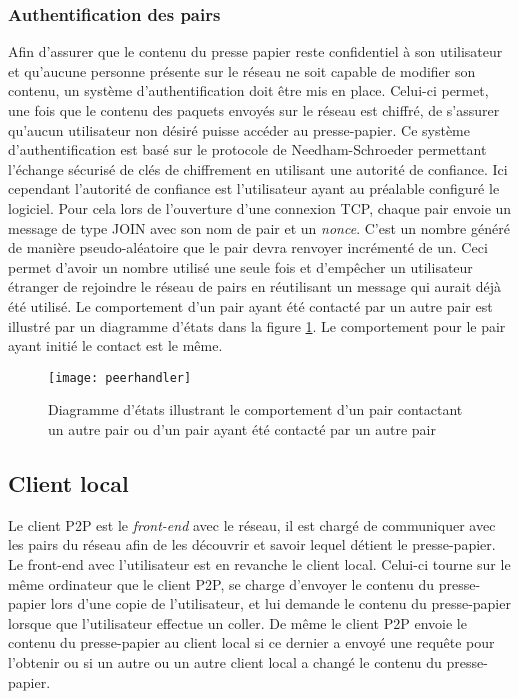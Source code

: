 \subsubsection{Authentification des pairs}
Afin d'assurer que le contenu du presse papier reste confidentiel à son
utilisateur et qu'aucune personne présente sur le réseau ne soit capable de
modifier son contenu, un système d'authentification doit être mis en place.
Celui-ci permet, une fois que le contenu des paquets envoyés sur le réseau est
chiffré, de s'assurer qu'aucun utilisateur non désiré puisse accéder au
presse-papier.
Ce système d'authentification est basé sur le protocole de Needham-Schroeder
\cite{1978Needham} permettant l'échange sécurisé de clés de chiffrement
en utilisant une autorité de confiance. Ici cependant l'autorité de confiance
est l'utilisateur ayant au préalable configuré le logiciel.
Pour cela lors de l'ouverture d'une connexion TCP, chaque
pair envoie un message de type JOIN avec son nom de pair et un
\emph{nonce}. C'est un nombre généré de manière pseudo-aléatoire que le
pair devra renvoyer incrémenté de un. Ceci permet d'avoir un nombre
utilisé une seule fois et d'empêcher un utilisateur étranger
de rejoindre le réseau de pairs en réutilisant un message qui aurait déjà
été utilisé. Le comportement d'un pair ayant été contacté par un autre pair
est illustré par un diagramme d'états dans la figure \ref{fig:peerhandler}.
Le comportement pour le pair ayant initié le contact est le même.

\begin{figure}[!h]
  \centering
  \texttt{[image: peerhandler]}
  \caption{Diagramme d'états illustrant le comportement d'un pair
    contactant un autre pair ou d'un pair ayant été contacté par un autre
    pair}
  \label{fig:peerhandler}
\end{figure}

\subsection{Client local}
Le client P2P est le \emph{front-end} avec le réseau, il est chargé
de communiquer avec les pairs du réseau afin de les découvrir et savoir
lequel détient le presse-papier. Le front-end avec l'utilisateur
est en revanche le client local. Celui-ci tourne sur le même ordinateur
que le client P2P, se charge d'envoyer le contenu du presse-papier
lors d'une copie de l'utilisateur, et lui demande le contenu du presse-papier
lorsque que l'utilisateur effectue un coller.
De même le client P2P envoie le contenu du presse-papier au client local si
ce dernier a envoyé une requête pour l'obtenir ou si un autre ou un autre
client local a changé le contenu du presse-papier.

